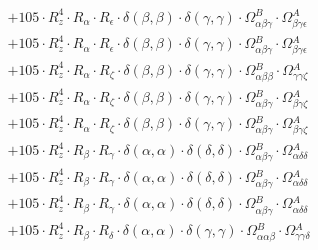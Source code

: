 \documentclass{article}
\begin{document}
\begin{subequations}
\begin{gather}
\begin{array}{c}
 \\[0.2em] 		 + 105 \cdot R_{z}^{4} \cdot R_{\alpha{}} \cdot R_{\epsilon{}} \cdot \delta{}\left(\beta{}, \beta{}\right) \cdot \delta{}\left(\gamma{}, \gamma{}\right) \cdot \Omega{}^{B}_{\alpha{}\beta{}\gamma{}} \cdot \Omega{}^{A}_{\beta{}\gamma{}\epsilon{}} 
 \\[0.2em] 		 + 105 \cdot R_{z}^{4} \cdot R_{\alpha{}} \cdot R_{\epsilon{}} \cdot \delta{}\left(\beta{}, \beta{}\right) \cdot \delta{}\left(\gamma{}, \gamma{}\right) \cdot \Omega{}^{B}_{\alpha{}\beta{}\gamma{}} \cdot \Omega{}^{A}_{\beta{}\gamma{}\epsilon{}} 
 \\[0.2em] 		 + 105 \cdot R_{z}^{4} \cdot R_{\alpha{}} \cdot R_{\zeta{}} \cdot \delta{}\left(\beta{}, \beta{}\right) \cdot \delta{}\left(\gamma{}, \gamma{}\right) \cdot \Omega{}^{B}_{\alpha{}\beta{}\beta{}} \cdot \Omega{}^{A}_{\gamma{}\gamma{}\zeta{}} 
 \\[0.2em] 		 + 105 \cdot R_{z}^{4} \cdot R_{\alpha{}} \cdot R_{\zeta{}} \cdot \delta{}\left(\beta{}, \beta{}\right) \cdot \delta{}\left(\gamma{}, \gamma{}\right) \cdot \Omega{}^{B}_{\alpha{}\beta{}\gamma{}} \cdot \Omega{}^{A}_{\beta{}\gamma{}\zeta{}} 
 \\[0.2em] 		 + 105 \cdot R_{z}^{4} \cdot R_{\alpha{}} \cdot R_{\zeta{}} \cdot \delta{}\left(\beta{}, \beta{}\right) \cdot \delta{}\left(\gamma{}, \gamma{}\right) \cdot \Omega{}^{B}_{\alpha{}\beta{}\gamma{}} \cdot \Omega{}^{A}_{\beta{}\gamma{}\zeta{}} 
 \\[0.2em] 		 + 105 \cdot R_{z}^{4} \cdot R_{\beta{}} \cdot R_{\gamma{}} \cdot \delta{}\left(\alpha{}, \alpha{}\right) \cdot \delta{}\left(\delta{}, \delta{}\right) \cdot \Omega{}^{B}_{\alpha{}\beta{}\gamma{}} \cdot \Omega{}^{A}_{\alpha{}\delta{}\delta{}} 
 \\[0.2em] 		 + 105 \cdot R_{z}^{4} \cdot R_{\beta{}} \cdot R_{\gamma{}} \cdot \delta{}\left(\alpha{}, \alpha{}\right) \cdot \delta{}\left(\delta{}, \delta{}\right) \cdot \Omega{}^{B}_{\alpha{}\beta{}\gamma{}} \cdot \Omega{}^{A}_{\alpha{}\delta{}\delta{}} 
 \\[0.2em] 		 + 105 \cdot R_{z}^{4} \cdot R_{\beta{}} \cdot R_{\gamma{}} \cdot \delta{}\left(\alpha{}, \alpha{}\right) \cdot \delta{}\left(\delta{}, \delta{}\right) \cdot \Omega{}^{B}_{\alpha{}\beta{}\gamma{}} \cdot \Omega{}^{A}_{\alpha{}\delta{}\delta{}} 
 \\[0.2em] 		 + 105 \cdot R_{z}^{4} \cdot R_{\beta{}} \cdot R_{\delta{}} \cdot \delta{}\left(\alpha{}, \alpha{}\right) \cdot \delta{}\left(\gamma{}, \gamma{}\right) \cdot \Omega{}^{B}_{\alpha{}\alpha{}\beta{}} \cdot \Omega{}^{A}_{\gamma{}\gamma{}\delta{}} 

\end{array}
\end{gather}
\end{subequations}
\end{document}
